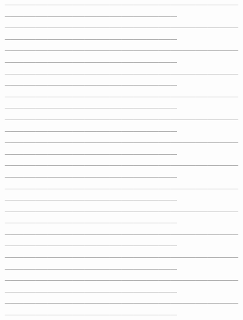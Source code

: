 \begin{enumerate}
    \_\_\_\_\_\_\_\_\_\_\_\_\_\_\_\_\_\_\_\_\_\_\_\_\_\_\_\_\_\_\_\_\_\_\_\_\_\_
    \!\!\_\_\_\_\_\_\_\_\_\_\_\_\_\_\_\_\_\_\_\_\_\_\_\_\_\_\_\_\\
    \_\_\_\_\_\_\_\_\_\_\_\_\_\_\_\_\_\_\_\_\_\_\_\_\_\_\_\_\_\_\_\_\_\_\_\_\_\_
    \!\!\_\_\_\_\_\_\_\_\_\_\_\_\_\_\_\_\_\_\_\_\_\_\_\_\_\_\_\_\\
    \_\_\_\_\_\_\_\_\_\_\_\_\_\_\_\_\_\_\_\_\_\_\_\_\_\_\_\_\_\_\_\_\_\_\_\_\_\_
    \!\!\_\_\_\_\_\_\_\_\_\_\_\_\_\_\_\_\_\_\_\_\_\_\_\_\_\_\_\_\\
    \_\_\_\_\_\_\_\_\_\_\_\_\_\_\_\_\_\_\_\_\_\_\_\_\_\_\_\_\_\_\_\_\_\_\_\_\_\_
    \!\!\_\_\_\_\_\_\_\_\_\_\_\_\_\_\_\_\_\_\_\_\_\_\_\_\_\_\_\_\\
    \_\_\_\_\_\_\_\_\_\_\_\_\_\_\_\_\_\_\_\_\_\_\_\_\_\_\_\_\_\_\_\_\_\_\_\_\_\_
    \!\!\_\_\_\_\_\_\_\_\_\_\_\_\_\_\_\_\_\_\_\_\_\_\_\_\_\_\_\_\\
    \_\_\_\_\_\_\_\_\_\_\_\_\_\_\_\_\_\_\_\_\_\_\_\_\_\_\_\_\_\_\_\_\_\_\_\_\_\_
    \!\!\_\_\_\_\_\_\_\_\_\_\_\_\_\_\_\_\_\_\_\_\_\_\_\_\_\_\_\_\\
    \_\_\_\_\_\_\_\_\_\_\_\_\_\_\_\_\_\_\_\_\_\_\_\_\_\_\_\_\_\_\_\_\_\_\_\_\_\_
    \!\!\_\_\_\_\_\_\_\_\_\_\_\_\_\_\_\_\_\_\_\_\_\_\_\_\_\_\_\_\\
    \_\_\_\_\_\_\_\_\_\_\_\_\_\_\_\_\_\_\_\_\_\_\_\_\_\_\_\_\_\_\_\_\_\_\_\_\_\_
    \!\!\_\_\_\_\_\_\_\_\_\_\_\_\_\_\_\_\_\_\_\_\_\_\_\_\_\_\_\_\\
    \_\_\_\_\_\_\_\_\_\_\_\_\_\_\_\_\_\_\_\_\_\_\_\_\_\_\_\_\_\_\_\_\_\_\_\_\_\_
    \!\!\_\_\_\_\_\_\_\_\_\_\_\_\_\_\_\_\_\_\_\_\_\_\_\_\_\_\_\_\\
    \_\_\_\_\_\_\_\_\_\_\_\_\_\_\_\_\_\_\_\_\_\_\_\_\_\_\_\_\_\_\_\_\_\_\_\_\_\_
    \!\!\_\_\_\_\_\_\_\_\_\_\_\_\_\_\_\_\_\_\_\_\_\_\_\_\_\_\_\_\\
    \_\_\_\_\_\_\_\_\_\_\_\_\_\_\_\_\_\_\_\_\_\_\_\_\_\_\_\_\_\_\_\_\_\_\_\_\_\_
    \!\!\_\_\_\_\_\_\_\_\_\_\_\_\_\_\_\_\_\_\_\_\_\_\_\_\_\_\_\_\\
    \_\_\_\_\_\_\_\_\_\_\_\_\_\_\_\_\_\_\_\_\_\_\_\_\_\_\_\_\_\_\_\_\_\_\_\_\_\_
    \!\!\_\_\_\_\_\_\_\_\_\_\_\_\_\_\_\_\_\_\_\_\_\_\_\_\_\_\_\_\\
    \_\_\_\_\_\_\_\_\_\_\_\_\_\_\_\_\_\_\_\_\_\_\_\_\_\_\_\_\_\_\_\_\_\_\_\_\_\_
    \!\!\_\_\_\_\_\_\_\_\_\_\_\_\_\_\_\_\_\_\_\_\_\_\_\_\_\_\_\_\\
    \_\_\_\_\_\_\_\_\_\_\_\_\_\_\_\_\_\_\_\_\_\_\_\_\_\_\_\_\_\_\_\_\_\_\_\_\_\_
    \!\!\_\_\_\_\_\_\_\_\_\_\_\_\_\_\_\_\_\_\_\_\_\_\_\_\_\_\_\_\\

\end{enumerate}
